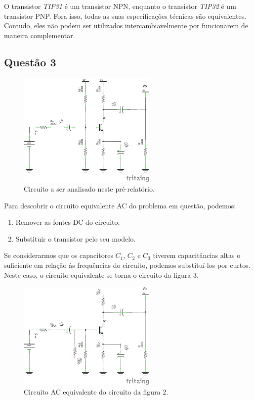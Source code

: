 \documentclass[12pt, a4paper, twoside]{article}
\begin{document}
O transistor \textit{TIP31} é um transistor NPN, enquanto o transistor \textit{TIP32} é um transistor PNP. Fora isso, todas as suas especificações técnicas são equivalentes. Contudo, eles não podem ser utilizados intercambiavelmente por funcionarem de maneira complementar.

\subsection{Questão 3}

\begin{figure}[H]
    \centering
    \includegraphics[width=0.6\textwidth]{figs/rel6/circuit.png}
    \caption{Circuito a ser analisado neste pré-relatório.}
\end{figure}

Para descobrir o circuito equivalente AC do problema em questão, podemos:

\begin{enumerate}
    \item Remover as fontes DC do circuito;
    \item Substituir o transistor pelo seu modelo.
\end{enumerate}

Se considerarmos que os capacitores $C_1$, $C_2$ e $C_3$ tiverem capacitâncias altas o suficiente em relação às frequências do circuito, podemos substituí-los por curtos. Neste caso, o circuito equivalente se torna o circuito da figura 3.

\begin{figure}[H]
    \centering
    \includegraphics[width=0.6\textwidth]{figs/rel6/ac_eq.png}
    \caption{Circuito AC equivalente do circuito da figura 2.}
\end{figure}
\end{document}
